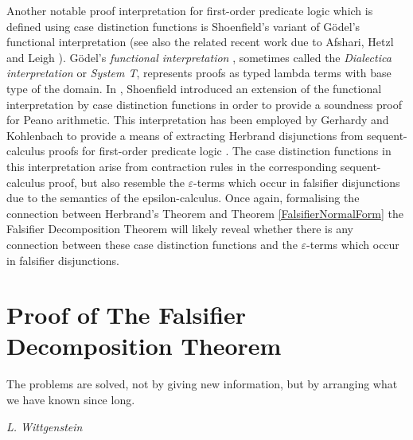 \documentclass[10pt]{article}
\theoremstyle{definition}\newtheorem{remark}[theorem]{Remark}
\theoremstyle{definition}\newtheorem{example}[theorem]{Example}
\theoremstyle{definition}\newtheorem{definition}[theorem]{Definition}
\begin{document}
	Another notable proof interpretation for first-order predicate logic which is defined using case distinction functions is Shoenfield's variant of Gödel's functional interpretation \cite{ShoenfieldLogic, GerhardyKohlenbachFunctional} (see also the related recent work due to Afshari, Hetzl and Leigh \cite{AfshariHetzlLeigh}). Gödel's \textit{functional interpretation} \cite{GodelDialectica}, sometimes called the \textit{Dialectica interpretation} or \textit{System T}, represents proofs as typed lambda terms with base type of the domain. In \cite{ShoenfieldLogic}, Shoenfield introduced an extension of the functional interpretation by case distinction functions in order to provide a soundness proof for Peano arithmetic. This interpretation has been employed by Gerhardy and Kohlenbach to provide a means of extracting Herbrand disjunctions from sequent-calculus proofs for first-order predicate logic \cite{GerhardyKohlenbachFunctional}. The case distinction functions in this interpretation arise from contraction rules in the corresponding sequent-calculus proof, but also resemble the $\varepsilon$-terms which occur in falsifier disjunctions due to the semantics of the epsilon-calculus. Once again, formalising the connection between Herbrand's Theorem and Theorem \ref{FalsifierNormalForm} the Falsifier Decomposition Theorem will likely reveal whether there is any connection between these case distinction functions and the $\varepsilon$-terms which occur in falsifier disjunctions.
	
	\pagebreak
	
	\section{Proof of The Falsifier Decomposition Theorem}\label{ProofSection}
	
	\epigraph{The problems are solved, not by giving new information, but by arranging what we have known since long.}{\textit{L. Wittgenstein}}
	
\end{document}
